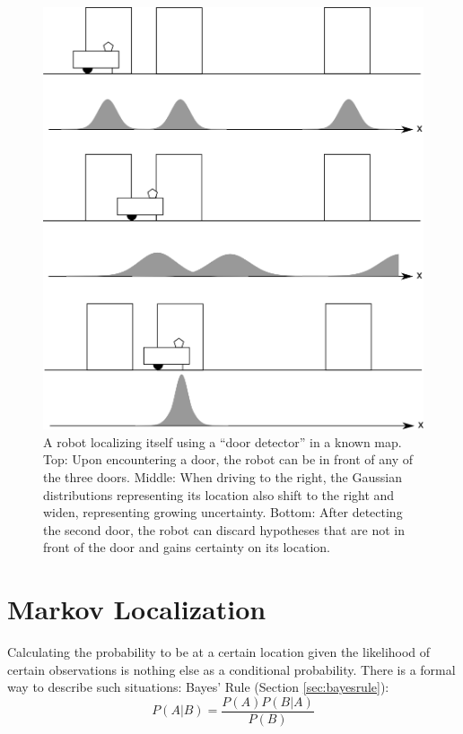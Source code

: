 \begin{figure}
	\centering
		\includegraphics[width=\textwidth]{figs/three_door_example}
	\caption{A robot localizing itself using a ``door detector'' in a known map. Top: Upon encountering a door, the robot can be in front of any of the three doors. Middle: When driving to the right, the Gaussian distributions representing its location also shift to the right and widen, representing growing uncertainty. Bottom: After detecting the second door, the robot can discard hypotheses that are not in front of the door and gains certainty on its location. }
	\label{fig:three_door_example}
\end{figure}

\section{Markov Localization}\label{sec:markovloc}
Calculating the probability to be at a certain location given the likelihood of certain observations is nothing else as a conditional probability. There is a formal way to describe such situations: Bayes' Rule (Section \ref{sec:bayesrule}):
\begin{equation}
P(A|B)=\frac{P(A)P(B|A)}{P(B)}
\end{equation}
